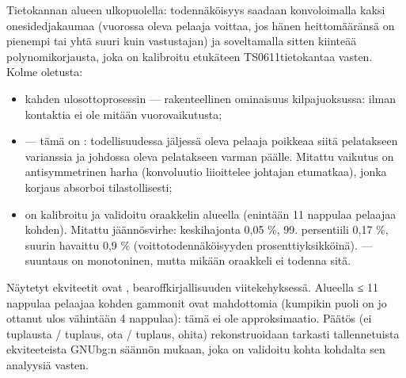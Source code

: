 \documentclass[letterpaper,10pt,finnish]{sphinxmanual}
\begin{document}
\sphinxAtStartPar
{} Tietokannan alueen ulkopuolella: todennäköisyys saadaan konvoloimalla kaksi one\sphinxhyphen{}sided\sphinxhyphen{}jakaumaa (vuorossa oleva pelaaja voittaa, jos hänen heittomääränsä on pienempi tai yhtä suuri kuin vastustajan) ja soveltamalla sitten kiinteää polynomikorjausta, joka on kalibroitu etukäteen TS\sphinxhyphen{}06\sphinxhyphen{}11\sphinxhyphen{}tietokantaa vasten. Kolme oletusta:
\begin{itemize}
\item {} 
\sphinxAtStartPar
kahden ulosottoprosessin  — rakenteellinen ominaisuus kilpajuoksussa: ilman kontaktia ei ole mitään vuorovaikutusta;

\item {} 
\sphinxAtStartPar
{} — tämä on : todellisuudessa jäljessä oleva pelaaja poikkeaa siitä pelatakseen varianssia ja johdossa oleva pelatakseen varman päälle. Mitattu vaikutus on antisymmetrinen harha (konvoluutio liioittelee johtajan etumatkaa), jonka korjaus absorboi tilastollisesti;

\item {} 
\sphinxAtStartPar
{} on kalibroitu ja validoitu oraakkelin alueella (enintään 11 nappulaa pelaajaa kohden). Mitattu jäännösvirhe: keskihajonta 0,05 \%, 99. persentiili 0,17 \%, suurin havaittu 0,9 \% (voittotodennäköisyyden prosenttiyksikköinä).  — suuntaus on monotoninen, mutta mikään oraakkeli ei todenna sitä.

\end{itemize}

\sphinxAtStartPar
{} Näytetyt ekviteetit ovat , bearoff\sphinxhyphen{}kirjallisuuden viitekehyksessä. Alueella ≤ 11 nappulaa pelaajaa kohden gammonit ovat mahdottomia (kumpikin puoli on jo ottanut ulos vähintään 4 nappulaa): tämä ei ole approksimaatio. Päätös (ei tuplausta / tuplaus, ota / tuplaus, ohita) rekonstruoidaan tarkasti tallennetuista ekviteeteista GNUbg:n säännön mukaan, joka on validoitu kohta kohdalta sen analyysiä vasten.
\end{document}
